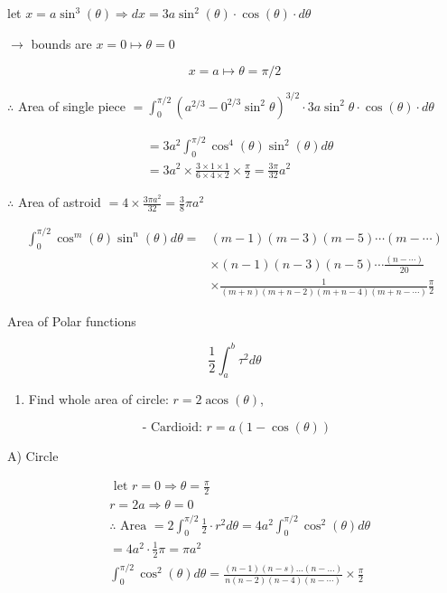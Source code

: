 \documentclass[12pt, a4paper]{article}
\begin{document}
let $x=a \sin ^{3}(\theta) \Rightarrow d x=3 a \sin ^{2}(\theta) \cdot \cos (\theta) \cdot d \theta$

$\rightarrow$ bounds are $x=0 \mapsto \theta=0$

$$
x=a \mapsto \theta=\pi / 2
$$

$\therefore$ Area of single piece $=\int_{0}^{\pi / 2}\left(a^{2 / 3}-0^{2 / 3} \sin ^{2} \theta\right)^{3 / 2} \cdot 3 a \sin ^{2} \theta \cdot \cos (\theta) \cdot d \theta$

$$
\begin{aligned}
& =3 a^{2} \int_{0}^{\pi / 2} \cos ^{4}(\theta) \sin ^{2}(\theta) d \theta \\
& =3 a^{2} \times \frac{3 \times 1 \times 1}{6 \times 4 \times 2} \times \frac{\pi}{2}=\frac{3 \pi}{32} a^{2}
\end{aligned}
$$

$\therefore$ Area of astroid $=4 \times \frac{3 \pi a^{2}}{32}=\frac{3}{8} \pi a^{2}$

$$
\begin{aligned}
\int_{0}^{\pi / 2} \cos ^{m}(\theta) \sin ^{n}(\theta) d \theta= & (m-1)(m-3)(m-5) \cdots(m-\cdots) \\
& \times(n-1)(n-3)(n-5) \cdots \frac{(n-\cdots)}{20} \\
& \times \frac{1}{(m+n)(m+n-2)(m+n-4)(m+n-\cdots)} \frac{\pi}{2}
\end{aligned}
$$

Area of Polar functions

$$
\frac{1}{2} \int_{a}^{b} \tau^{2} d \theta
$$

\begin{enumerate}
  \item Find whole area of circle: $r=2 \operatorname{acos}(\theta)$,
\end{enumerate}

$$
\text { - Cardioid: } r=a(1-\cos (\theta))
$$

A) Circle

$$
\begin{aligned}
& \text { let } r=0 \Rightarrow \theta=\frac{\pi}{2} \\
& r=2 a \Rightarrow \theta=0 \\
& \therefore \text { Area }=2 \int_{0}^{\pi / 2} \frac{1}{2} \cdot r^{2} d \theta=4 a^{2} \int_{0}^{\pi / 2} \cos ^{2}(\theta) d \theta \\
& =4 a^{2} \cdot \frac{1}{2} \pi=\pi a^{2} \\
& \int_{0}^{\pi / 2} \cos ^{2}(\theta) d \theta=\frac{(n-1)(n-s) \ldots(n-\ldots)}{n(n-2)(n-4)(n-\cdots)} \times \frac{\pi}{2}
\end{aligned}
$$
\end{document}
